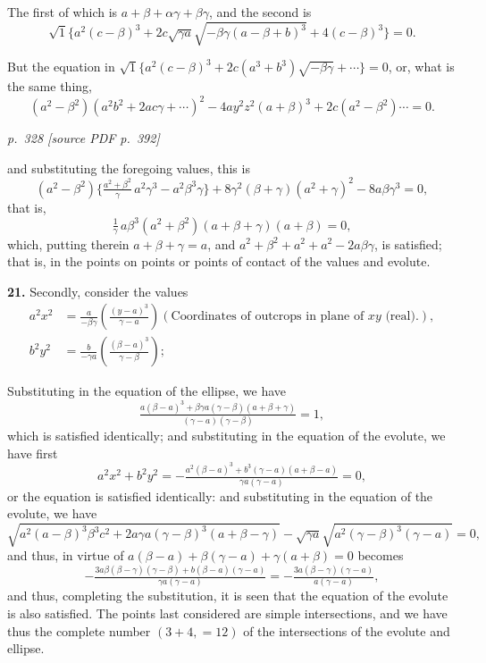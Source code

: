 \documentclass[11pt,a4paper]{article}
\newcommand{\pagemarker}[2]{\par\bigskip\noindent\textit{p.~#1 [source PDF p.~#2]}\par\smallskip}
\begin{document}
The first of which is $a + \beta + \alpha\gamma + \beta\gamma$, and the second is
\[
\sqrt{1}\{a^2(c - \beta)^3 + 2c\sqrt{\gamma a}\sqrt{-\beta\gamma(a - \beta + b)^3} + 4(c - \beta)^3\} = 0.
\]

But the equation in $\sqrt{1}\{a^2(c - \beta)^3 + 2c(a^3 + b^3)\sqrt{-\beta\gamma} + \cdots\} = 0$,
or, what is the same thing,
\[
(a^2 - \beta^2)(a^2 b^2 + 2a c \gamma + \cdots)^2 - 4ay^2 z^2(a + \beta)^3 + 2c(a^2 - \beta^2)\cdots = 0.
\]

\clearpage

\pagemarker{328}{392}

and substituting the foregoing values, this is
\[
(a^2 - \beta^2)\{\tfrac{a^2 + \beta^2}{\gamma}\,a^2\gamma^3 - a^2 \beta^3\gamma\} + 8\gamma^2(\beta + \gamma)(a^2 + \gamma)^2 - 8a\beta\gamma^3 = 0,
\]
that is,
\[
\tfrac{1}{\gamma}\,a\beta^3(a^2 + \beta^2)(a + \beta + \gamma)(a + \beta) = 0,
\]
which, putting therein $a + \beta + \gamma = a$, and $a^2 + \beta^2 + a^2 + a^2 - 2a\beta\gamma$, is satisfied; that is, in the points on points or points of contact of the values and evolute.

\textbf{21.} Secondly, consider the values
\begin{align*}
a^2 x^2 &= \tfrac{a}{-\beta\gamma}\!\left(\tfrac{(y - a)^3}{\gamma - a}\right) (\text{Coordinates of outcrops in plane of $xy$ (real).}),\\
b^2 y^2 &= \tfrac{b}{-\gamma a}\!\left(\tfrac{(\beta - a)^3}{\gamma - \beta}\right);
\end{align*}

Substituting in the equation of the ellipse, we have
\[
\tfrac{a(\beta - a)^3 + \beta\gamma a(\gamma - \beta)(a + \beta + \gamma)}{(\gamma - a)(\gamma - \beta)} = 1,
\]
which is satisfied identically; and substituting in the equation of the evolute, we have first
\[
a^2 x^2 + b^2 y^2 = -\tfrac{a^2(\beta - a)^3 + b^3(\gamma - a)(a + \beta - a)}{\gamma a(\gamma - a)} = 0,
\]
or the equation is satisfied identically: and substituting in the equation of the evolute, we have
\[
\sqrt{a^2(a - \beta)^3 \beta^3 c^2 + 2a\gamma a(\gamma - \beta)^3(a + \beta - \gamma)} - \sqrt{\gamma a}\sqrt{a^2(\gamma - \beta)^3(\gamma - a)} = 0,
\]
and thus, in virtue of $a(\beta - a) + \beta(\gamma - a) + \gamma(a + \beta) = 0$ becomes
\[
-\tfrac{3a\beta(\beta - \gamma)(\gamma - \beta) + b(\beta - a)(\gamma - a)}{\gamma a(\gamma - a)} = -\tfrac{3a(\beta - \gamma)(\gamma - a)}{a(\gamma - a)},
\]
and thus, completing the substitution, it is seen that the equation of the evolute is also satisfied. The points last considered are simple intersections, and we have thus the complete number $(3 + 4, = 12)$ of the intersections of the evolute and ellipse.
\end{document}
